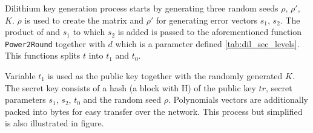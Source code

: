 Dilithium key generation process starts by generating three random seeds $\rho$, $\rho'$, $K$. $\rho$ is used to create the matrix  and $\rho'$ for generating error vectors $s_1$, $s_2$. The product of  and $s_1$ to which $s_2$ is added is passed to the aforementioned function \texttt{Power2Round} together with $d$ which is a parameter defined \ref{tab:dil_sec_levels}. This functions splits $t$ into $t_1$ and $t_0$.

Variable $t_1$ is used as the public key together with the randomly generated $K$. The secret key consists of a hash (a block with H) of the public key $tr$, secret parameters $s_1$, $s_2$, $t_0$ and the random seed $\rho$. Polynomials vectors are additionally packed into bytes for easy transfer over the network. This process but simplified is also illustrated in figure.

